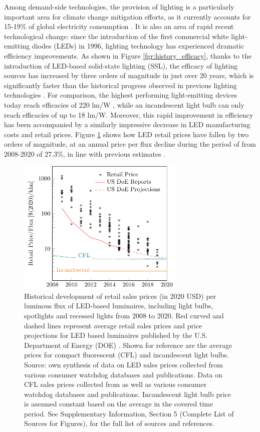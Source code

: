 \documentclass[journal=jacsat,manuscript=article]{achemso}
\begin{document}
Among demand-side technologies, the provision of lighting is a particularly important area for climate change mitigation efforts, as it currently   accounts for 15-19\% of global electricity consumption \cite{Zissis2016}\cite{doe_electricity}. It is also an area of rapid recent technological change: since the introduction of the first commercial white light-emitting diodes (LEDs) in 1996, lighting technology has experienced dramatic efficiency improvements.  As shown in Figure \ref{fgr:history_efficacy}, thanks to the introduction of LED-based solid-state lighting (SSL), the efficacy of lighting sources has increased by three orders of magnitude in just over 20 years, which is significantly faster than the historical progress observed in previous lighting technologies \cite{weinold2021quantifying}. For comparison, the highest performing light-emitting devices today reach efficacies of 220 lm/W \cite{lumistrips2021mid}, while an incandescent light bulb can only reach efficacies of up to 18 lm/W. Moreover, this rapid improvement in efficiency has been accompanied by a similarly impressive decrease in LED manufacturing costs and retail prices. Figure \ref{fgr:cost_lamp_small} shows how LED retail prices have fallen by two orders of magnitude, at an annual price per flux decline during the period of from 2008-2020 of 27.3\%, in line with previous estimates \cite{Gerke2020}.

\begin{figure}[h]
\centering
  \includegraphics[height=6.5cm]{2_SSL_EST/article/figures/cost_lamp_small.pdf}
  \caption{Historical development of retail sales prices (in 2020 USD) per luminous flux of LED-based luminaires, including light bulbs, spotlights and recessed lights from 2008 to 2020. Red curved and dashed lines represent average retail sales prices and price projections for LED based luminaires published by the U.S. Department of Energy (DOE) \cite{council2013assessment}. Shown for reference are the average prices for compact fluorescent (CFL) and incandescent light bulbs. Source: own synthesis of data on LED sales prices collected from various consumer watchdog databases and publications. Data on CFL sales prices collected from \cite{eger2018origin} as well as various consumer watchdog databases and publications. Incandescent light bulb price is assumed constant based on the average in the covered time period. See Supplementary Information, Section 5 (Complete List of Sources for Figures), for the full list of sources and references.}
  \label{fgr:cost_lamp_small}
\end{figure}
\end{document}
